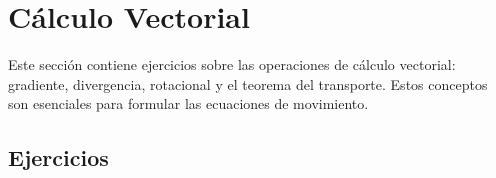 \section{Cálculo Vectorial}

Este sección contiene ejercicios sobre las operaciones de cálculo vectorial:
gradiente, divergencia, rotacional y el teorema del transporte.
Estos conceptos son esenciales para formular las ecuaciones de movimiento.

\subsection{Ejercicios}


\clearpage

\clearpage

\clearpage

\clearpage

\clearpage

\clearpage

\clearpage

